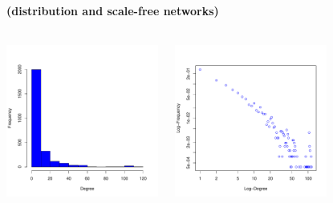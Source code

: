 \documentclass[8pt]{beamer}
\begin{document}
\begin{frame}
\frametitle{\insertsection}
\framesubtitle{\insertsubsection \hspace{0.05cm} (distribution and scale-free networks)}

\begin{columns}[c]

\includegraphics[width=5cm]{yeast1}

\includegraphics[width=5cm]{yeast2}

\end{columns}


\begin{columns}[t]





\end{columns}
 
\end{frame}

\end{document}
